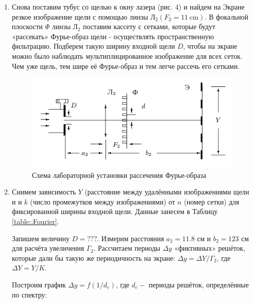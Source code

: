 \documentclass[a4paper,12pt]{article}
\begin{document}
\begin{enumerate}
    \item Снова поставим тубус со щелью к окну лазера (рис. 4) и найдем на Экране резкое изображение щели с помощью линзы Л$_{2}\left(F_{2} = 11 \mathrm{~cm}\right) .$ В фокальной плоскости $\Phi$ линзы Л$_{2}$ поставим кассету с сетками, которые будут «рассекать» Фурье-образ щели - осуществлять пространственную фильтрацию. Подберем такую ширину входной щели $D$, чтобы на экране можно было наблюдать мультиплицированное изображение для всех сеток. Чем уже щель, тем шире её Фурье-образ и тем легче рассечь его сетками.
    
    \begin{figure}[h]
        \centering
        \includegraphics[width=15cm]{scheme_IV.png}
        \caption{Схема лабораторной установки рассечения Фурье-образа}
        \label{fig:scheme_IV}
    \end{figure}
    
    \newpage
    
    \item Снимем зависимость $Y$ (расстояние между удалёнными изображениями щели и и $k$ (число промежутков между изображениями) от $n$ (номер сетки) для фиксированной ширины входной щели. Данные занесем в Таблицу \ref{table::Fourier}.

    Запишем величину $D = ???$. Измерим расстояния $a_{2} = 11.8$ см и $b_{2} = 123$ см для расчёта увеличения $\Gamma_{2}$. Рассчитаем периоды $\Delta y$ «фиктивных» решёток, которые дали бы такую же периодичность на экране: $\Delta y=\Delta Y / \Gamma_{2}$, где $\Delta Y=Y / K .$

    Построим график $\Delta y=f\left(1 / d_{c}\right)$, где $d_{c}-$ периоды решёток, определённые по спектру:
        

\end{enumerate}
\end{document}
